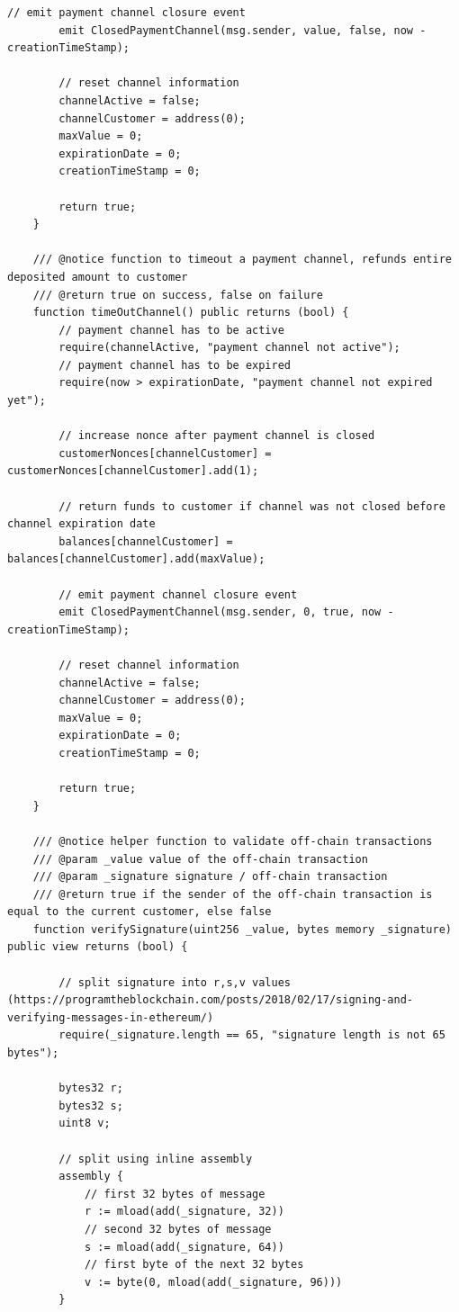 \begin{lstlisting}[language=Solidity, caption={Payment channel smart contract}, label={lis:pc_sc}]
        // emit payment channel closure event
        emit ClosedPaymentChannel(msg.sender, value, false, now - creationTimeStamp);

        // reset channel information
        channelActive = false;
        channelCustomer = address(0);
        maxValue = 0;
        expirationDate = 0;
        creationTimeStamp = 0;

        return true;
    }

    /// @notice function to timeout a payment channel, refunds entire deposited amount to customer
    /// @return true on success, false on failure
    function timeOutChannel() public returns (bool) {
        // payment channel has to be active
        require(channelActive, "payment channel not active");
        // payment channel has to be expired
        require(now > expirationDate, "payment channel not expired yet");

        // increase nonce after payment channel is closed
        customerNonces[channelCustomer] = customerNonces[channelCustomer].add(1);

        // return funds to customer if channel was not closed before channel expiration date
        balances[channelCustomer] = balances[channelCustomer].add(maxValue);

        // emit payment channel closure event
        emit ClosedPaymentChannel(msg.sender, 0, true, now - creationTimeStamp);

        // reset channel information
        channelActive = false;
        channelCustomer = address(0);
        maxValue = 0;
        expirationDate = 0;
        creationTimeStamp = 0;

        return true;
    }

    /// @notice helper function to validate off-chain transactions
    /// @param _value value of the off-chain transaction
    /// @param _signature signature / off-chain transaction
    /// @return true if the sender of the off-chain transaction is equal to the current customer, else false
    function verifySignature(uint256 _value, bytes memory _signature) public view returns (bool) {

        // split signature into r,s,v values (https://programtheblockchain.com/posts/2018/02/17/signing-and-verifying-messages-in-ethereum/)
        require(_signature.length == 65, "signature length is not 65 bytes");

        bytes32 r;
        bytes32 s;
        uint8 v;

        // split using inline assembly
        assembly {
            // first 32 bytes of message
            r := mload(add(_signature, 32))
            // second 32 bytes of message
            s := mload(add(_signature, 64))
            // first byte of the next 32 bytes
            v := byte(0, mload(add(_signature, 96)))
        }


\end{lstlisting}
